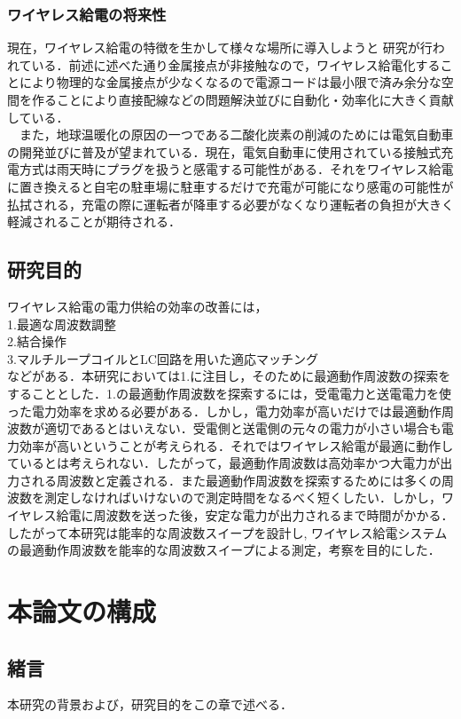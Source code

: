 \documentclass[12pt]{jarticle}
\begin{document}
\subsubsection{ワイヤレス給電の将来性}
現在，ワイヤレス給電の特徴を生かして様々な場所に導入しようと 研究が行われている．前述に述べた通り金属接点が非接触なので，ワイヤレス給電化することにより物理的な金属接点が少なくなるので電源コードは最小限で済み余分な空間を作ることにより直接配線などの問題解決並びに自動化・効率化に大きく貢献している\cite{syourai}\cite{matuda}．
\\　また，地球温暖化の原因の一つである二酸化炭素の削減のためには電気自動車の開発並びに普及が望まれている．現在，電気自動車に使用されている接触式充電方式は雨天時にプラグを扱うと感電する可能性がある．それをワイヤレス給電に置き換えると自宅の駐車場に駐車するだけで充電が可能になり感電の可能性が払拭される，充電の際に運転者が降車する必要がなくなり運転者の負担が大きく軽減されることが期待される．\cite{hakugin}
\clearpage
\subsection{研究目的}
ワイヤレス給電の電力供給の効率の改善には，
\\1.最適な周波数調整
\\2.結合操作
\\3.マルチループコイルとLC回路を用いた適応マッチング
\\などがある\cite{morita}．本研究においては1.に注目し，そのために最適動作周波数の探索をすることとした．1.の最適動作周波数を探索するには，受電電力と送電電力を使った電力効率を求める必要がある．しかし，電力効率が高いだけでは最適動作周波数が適切であるとはいえない．受電側と送電側の元々の電力が小さい場合も電力効率が高いということが考えられる．それではワイヤレス給電が最適に動作しているとは考えられない．したがって，最適動作周波数は高効率かつ大電力が出力される周波数と定義される．また最適動作周波数を探索するためには多くの周波数を測定しなければいけないので測定時間をなるべく短くしたい．しかし，ワイヤレス給電に周波数を送った後，安定な電力が出力されるまで時間がかかる．したがって本研究は能率的な周波数スイープを設計し,
ワイヤレス給電システムの最適動作周波数を能率的な周波数スイープによる測定，考察を目的にした．
\clearpage
\section{本論文の構成}
\subsection*{緒言}
	本研究の背景および，研究目的をこの章で述べる．
\end{document}
